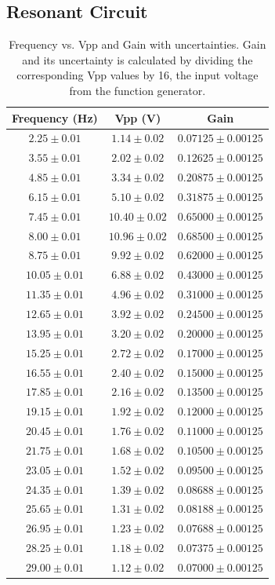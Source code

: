 \documentclass[12pt]{article}
\begin{document}
\clearpage
\subsection{Resonant Circuit}

\begin{table}[h]
\centering
\begin{tabular}{|c|c|c|}
\hline
\textbf{Frequency (Hz)} & \textbf{Vpp (V)} & \textbf{Gain} \\
\hline
$2.25 \pm 0.01$  & $1.14 \pm 0.02$  & $0.07125 \pm 0.00125$ \\
$3.55 \pm 0.01$  & $2.02 \pm 0.02$  & $0.12625 \pm 0.00125$ \\
$4.85 \pm 0.01$  & $3.34 \pm 0.02$  & $0.20875 \pm 0.00125$ \\
$6.15 \pm 0.01$  & $5.10 \pm 0.02$  & $0.31875 \pm 0.00125$ \\
$7.45 \pm 0.01$  & $10.40 \pm 0.02$ & $0.65000 \pm 0.00125$ \\
$8.00 \pm 0.01$  & $10.96 \pm 0.02$ & $0.68500 \pm 0.00125$ \\
$8.75 \pm 0.01$  & $9.92 \pm 0.02$  & $0.62000 \pm 0.00125$ \\
$10.05 \pm 0.01$ & $6.88 \pm 0.02$  & $0.43000 \pm 0.00125$ \\
$11.35 \pm 0.01$ & $4.96 \pm 0.02$  & $0.31000 \pm 0.00125$ \\
$12.65 \pm 0.01$ & $3.92 \pm 0.02$  & $0.24500 \pm 0.00125$ \\
$13.95 \pm 0.01$ & $3.20 \pm 0.02$  & $0.20000 \pm 0.00125$ \\
$15.25 \pm 0.01$ & $2.72 \pm 0.02$  & $0.17000 \pm 0.00125$ \\
$16.55 \pm 0.01$ & $2.40 \pm 0.02$  & $0.15000 \pm 0.00125$ \\
$17.85 \pm 0.01$ & $2.16 \pm 0.02$  & $0.13500 \pm 0.00125$ \\
$19.15 \pm 0.01$ & $1.92 \pm 0.02$  & $0.12000 \pm 0.00125$ \\
$20.45 \pm 0.01$ & $1.76 \pm 0.02$  & $0.11000 \pm 0.00125$ \\
$21.75 \pm 0.01$ & $1.68 \pm 0.02$  & $0.10500 \pm 0.00125$ \\
$23.05 \pm 0.01$ & $1.52 \pm 0.02$  & $0.09500 \pm 0.00125$ \\
$24.35 \pm 0.01$ & $1.39 \pm 0.02$  & $0.08688 \pm 0.00125$ \\
$25.65 \pm 0.01$ & $1.31 \pm 0.02$  & $0.08188 \pm 0.00125$ \\
$26.95 \pm 0.01$ & $1.23 \pm 0.02$  & $0.07688 \pm 0.00125$ \\
$28.25 \pm 0.01$ & $1.18 \pm 0.02$  & $0.07375 \pm 0.00125$ \\
$29.00 \pm 0.01$ & $1.12 \pm 0.02$  & $0.07000 \pm 0.00125$ \\
\hline
\end{tabular}
\caption{Frequency vs. Vpp and Gain with uncertainties. Gain and its uncertainty is calculated by dividing the corresponding Vpp values by 16, the input voltage from the function generator. }
\label{tab:gain_freq}
\end{table}
\end{document}
